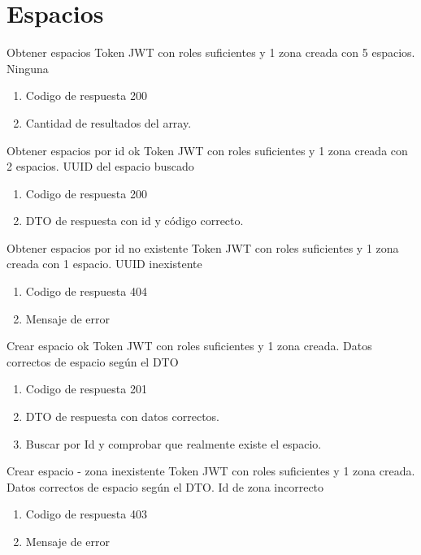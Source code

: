 \section{Espacios}
{Obtener espacios}
{Token JWT con roles suficientes y 1 zona creada con 5 espacios.}
{Ninguna}
{\begin{enumerate} [leftmargin=*, nosep]
    \item Codigo de respuesta 200
    \item Cantidad de resultados del array.
\end{enumerate}}

{Obtener espacios por id ok}
{Token JWT con roles suficientes y 1 zona creada con 2 espacios.}
{UUID del espacio buscado}
{\begin{enumerate} [leftmargin=*, nosep]
    \item Codigo de respuesta 200
    \item DTO de respuesta con id y código correcto.
\end{enumerate}}

{Obtener espacios por id no existente}
{Token JWT con roles suficientes y 1 zona creada con 1 espacio.}
{UUID inexistente}
{\begin{enumerate} [leftmargin=*, nosep]
    \item Codigo de respuesta 404
    \item Mensaje de error
\end{enumerate}}

{Crear espacio ok}
{Token JWT con roles suficientes y 1 zona creada.}
{Datos correctos de espacio según el DTO}
{\begin{enumerate} [leftmargin=*, nosep]
    \item Codigo de respuesta 201
    \item DTO de respuesta con datos correctos.
    \item Buscar por Id y comprobar que realmente existe el espacio.
\end{enumerate}}

{Crear espacio - zona inexistente}
{Token JWT con roles suficientes y 1 zona creada.}
{Datos correctos de espacio según el DTO. Id de zona incorrecto}
{\begin{enumerate} [leftmargin=*, nosep]
    \item Codigo de respuesta 403
    \item Mensaje de error
\end{enumerate}}

